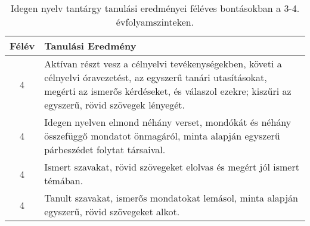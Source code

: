        
           \begin{longtable}{c | p{} }
            \caption[Idegen nyelv 3-4.]{Idegen nyelv tantárgy tanulási eredményei féléves bontásokban a 3-4. évfolyamszinteken. }  \\

            \textbf{Félév} & \textbf{Tanulási Eredmény} \\
            \hline
            \endhead
                                
                                          4 &  Aktívan részt vesz a célnyelvi tevékenységekben, követi a célnyelvi óravezetést, az egyszerű tanári utasításokat, megérti az ismerős kérdéseket, és válaszol ezekre; kiszűri az egyszerű, rövid szövegek lényegét. \\ \hline
                                          4 &  Idegen nyelven elmond néhány verset, mondókát és néhány összefüggő mondatot önmagáról, minta alapján egyszerű párbeszédet folytat társaival. \\ \hline
                                          4 &  Ismert szavakat, rövid szövegeket elolvas és megért jól ismert témában. \\ \hline
                                          4 &  Tanult szavakat, ismerős mondatokat lemásol, minta alapján egyszerű, rövid szövegeket alkot. \\ \hline
                                      
                        \end{longtable}
            \clearpage

